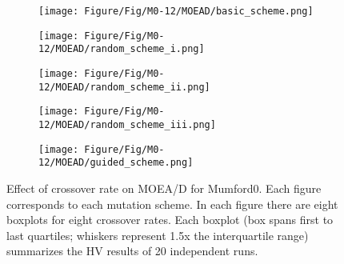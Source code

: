 \begin{figure}[!htbp]
	\centering
	\begin{subfigure}[b]{0.52\textwidth}
		\texttt{[image: Figure/Fig/M0-12/MOEAD/basic\_scheme.png]}
	\end{subfigure}%
	\begin{subfigure}[b]{0.52\textwidth}
		\texttt{[image: Figure/Fig/M0-12/MOEAD/random\_scheme\_i.png]}
	\end{subfigure}%
	\newline
	\begin{subfigure}[b]{0.52\textwidth}
		\texttt{[image: Figure/Fig/M0-12/MOEAD/random\_scheme\_ii.png]}
	\end{subfigure}%
	\begin{subfigure}[b]{0.52\textwidth}
		\texttt{[image: Figure/Fig/M0-12/MOEAD/random\_scheme\_iii.png]}
	\end{subfigure}%
	\newline
	\begin{subfigure}[b]{0.52\textwidth}
		\texttt{[image: Figure/Fig/M0-12/MOEAD/guided\_scheme.png]}
	\end{subfigure}%
	\caption{Effect of crossover rate on MOEA/D for Mumford0. Each figure corresponds to each mutation scheme. In each figure there are eight boxplots for eight crossover rates.  Each boxplot (box spans first to last quartiles; whiskers represent 1.5x the interquartile range) summarizes the HV results of 20 independent runs.}
	\label{fig:cr_m0_moead}
\end{figure}
